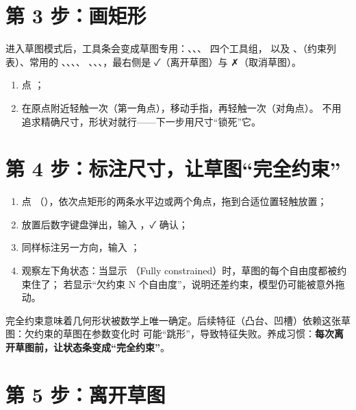 \section{第 3 步：画矩形}

进入草图模式后，工具条会变成草图专用：、、、 四个工具组，
以及 、（约束列表）、常用的 、、、、
、、、，最右侧是 ✓（离开草图）与 ✗（取消草图）。

\begin{enumerate}
  \item 点 ；
  \item 在原点附近轻触一次（第一角点），移动手指，再轻触一次（对角点）。
        不用追求精确尺寸，形状对就行——下一步用尺寸“锁死”它。
\end{enumerate}


\section{第 4 步：标注尺寸，让草图“完全约束”}

\begin{enumerate}
  \item 点 （），依次点矩形的两条水平边或两个角点，拖到合适位置轻触放置；
  \item 放置后数字键盘弹出，输入 ，✓ 确认；
  \item 同样标注另一方向，输入 ；
  \item 观察左下角状态：当显示 （Fully constrained）时，草图的每个自由度都被约束住了；
        若显示“欠约束 N 个自由度”，说明还差约束，模型仍可能被意外拖动。
\end{enumerate}

\begin{tip}[完全约束为什么重要？]
完全约束意味着几何形状被数学上唯一确定。后续特征（凸台、凹槽）依赖这张草图：欠约束的草图在参数变化时
可能“跳形”，导致特征失败。养成习惯：\textbf{每次离开草图前，让状态条变成“完全约束”}。
\end{tip}

\section{第 5 步：离开草图}

